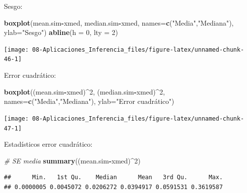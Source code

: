 \documentclass[
]{book}
\newenvironment{Shaded}{\begin{snugshade}}{\end{snugshade}}
\newcommand{\CommentTok}[1]{\textcolor[rgb]{0.56,0.35,0.01}{\textit{#1}}}
\newcommand{\DataTypeTok}[1]{\textcolor[rgb]{0.13,0.29,0.53}{#1}}
\newcommand{\DecValTok}[1]{\textcolor[rgb]{0.00,0.00,0.81}{#1}}
\newcommand{\KeywordTok}[1]{\textcolor[rgb]{0.13,0.29,0.53}{\textbf{#1}}}
\newcommand{\NormalTok}[1]{#1}
\newcommand{\OperatorTok}[1]{\textcolor[rgb]{0.81,0.36,0.00}{\textbf{#1}}}
\newcommand{\StringTok}[1]{\textcolor[rgb]{0.31,0.60,0.02}{#1}}
\theoremstyle{break}
\theoremstyle{definition}
\theoremstyle{definition}
\theoremstyle{definition}
\theoremstyle{remark}
\begin{document}
\begin{enumerate}
  Sesgo:

\begin{Shaded}
\begin{Highlighting}[]
\KeywordTok{boxplot}\NormalTok{(mean.sim}\OperatorTok{-}\NormalTok{xmed, median.sim}\OperatorTok{-}\NormalTok{xmed, }
      \DataTypeTok{names=}\KeywordTok{c}\NormalTok{(}\StringTok{"Media"}\NormalTok{,}\StringTok{"Mediana"}\NormalTok{), }\DataTypeTok{ylab=}\StringTok{"Sesgo"}\NormalTok{)}
\KeywordTok{abline}\NormalTok{(}\DataTypeTok{h =} \DecValTok{0}\NormalTok{, }\DataTypeTok{lty =} \DecValTok{2}\NormalTok{)}
\end{Highlighting}
\end{Shaded}

  \begin{center}\texttt{[image: 08-Aplicaciones\_Inferencia\_files/figure-latex/unnamed-chunk-46-1]} \end{center}

  Error cuadrático:

\begin{Shaded}
\begin{Highlighting}[]
\KeywordTok{boxplot}\NormalTok{((mean.sim}\OperatorTok{-}\NormalTok{xmed)}\OperatorTok{^}\DecValTok{2}\NormalTok{, (median.sim}\OperatorTok{-}\NormalTok{xmed)}\OperatorTok{^}\DecValTok{2}\NormalTok{, }
      \DataTypeTok{names=}\KeywordTok{c}\NormalTok{(}\StringTok{"Media"}\NormalTok{,}\StringTok{"Mediana"}\NormalTok{), }\DataTypeTok{ylab=}\StringTok{"Error cuadrático"}\NormalTok{)}
\end{Highlighting}
\end{Shaded}

  \begin{center}\texttt{[image: 08-Aplicaciones\_Inferencia\_files/figure-latex/unnamed-chunk-47-1]} \end{center}

  Estadísticos error cuadrático:

\begin{Shaded}
\begin{Highlighting}[]
\CommentTok{# SE media}
\KeywordTok{summary}\NormalTok{((mean.sim}\OperatorTok{-}\NormalTok{xmed)}\OperatorTok{^}\DecValTok{2}\NormalTok{) }
\end{Highlighting}
\end{Shaded}

\begin{verbatim}
##      Min.   1st Qu.    Median      Mean   3rd Qu.      Max. 
## 0.0000005 0.0045072 0.0206272 0.0394917 0.0591531 0.3619587
\end{verbatim}


\end{enumerate}
\end{document}
